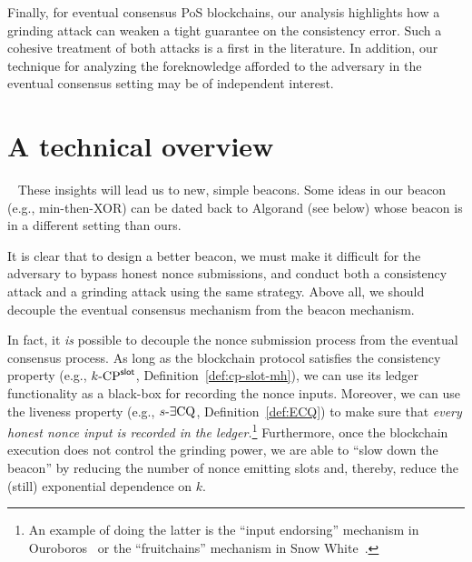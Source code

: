     Finally, for eventual consensus PoS blockchains, 
    our analysis highlights 
    how a grinding attack can weaken a tight guarantee on the consistency error. 
    Such a cohesive treatment of both attacks is a first in the literature.
    In addition, our technique for analyzing 
    the foreknowledge afforded to the adversary in the eventual consensus setting 
    may be of independent interest.




\section{A technical overview}~
    These insights will lead us to new, simple beacons. 
    Some ideas in our beacon (e.g., min-then-XOR) can be dated back to Algorand (see below) 
    whose beacon is in a different setting than ours.

    It is clear that to design a better beacon, 
    we must make it difficult for the adversary to 
    bypass honest nonce submissions, 
    and conduct both a consistency attack and a grinding attack using the same strategy. 
    Above all, we should decouple the eventual consensus mechanism 
    from the beacon mechanism.

    In fact, it \emph{is} possible to decouple the nonce submission process from the eventual consensus process. 
    As long as the blockchain protocol satisfies the consistency property (e.g., ${k}\text{-}\mathrm{CP}^{\mathsf{slot}}$, Definition~\ref{def:cp-slot-mh}), 
    we can use its ledger functionality as a black-box for recording the nonce inputs. 
    Moreover, we can use the liveness property (e.g., ${s}\text{-}\exists\mathrm{CQ}$, Definition~\ref{def:ECQ}) 
    to make sure that \emph{every honest nonce input is recorded in the ledger.}\footnote{ 
        An example of doing the latter is the ``input endorsing'' mechanism in Ouroboros~\cite{Ouroboros} 
        or the ``fruitchains'' mechanism in Snow White~\cite{SnowWhite,Fruitchains}.
    }
    Furthermore, once the blockchain execution does not control the grinding power, 
    we are able to ``slow down the beacon'' by reducing the number of nonce emitting slots 
    and, thereby, reduce the (still) exponential dependence on $k$.

